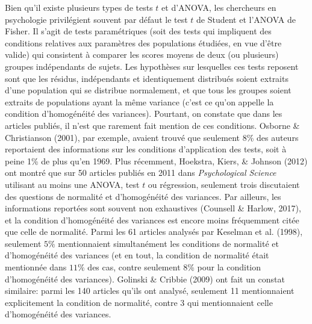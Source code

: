 \documentclass[
  12pt,
  french,
]{article}
\begin{document}
Bien qu'il existe plusieurs types de tests \(t\) et d'ANOVA, les
chercheurs en psychologie privilégient souvent par défaut le test \(t\)
de Student et l'ANOVA de
Fisher.
Il s'agit de tests paramétriques (soit des tests qui impliquent des
conditions relatives aux paramètres des populations étudiées, en vue
d'être valide) qui consistent à comparer les scores moyens de deux (ou
plusieurs) groupes indépendants de sujets. Les hypothèses sur lesquelles
ces tests reposent sont que les résidus, indépendants et identiquement
distribués soient extraits d'une population qui se distribue
normalement, et que tous les groupes soient extraits de populations
ayant la même variance (c'est ce qu'on appelle la condition
d'homogénéité des variances). Pourtant, on constate que dans les
articles publiés, il n'est que rarement fait mention de ces conditions.
Osborne \& Christianson (2001), par exemple, avaient trouvé que
seulement 8\% des auteurs reportaient des informations sur les
conditions d'application des tests, soit à peine 1\% de plus qu'en 1969.
Plus récemment, Hoekstra, Kiers, \& Johnson (2012) ont montré que sur 50
articles publiés en 2011 dans \emph{Psychological Science} utilisant au
moins une ANOVA, test \(t\) ou régression, seulement trois discutaient
des questions de normalité et d'homogénéité des variances. Par ailleurs,
les informations reportées sont souvent non exhaustives (Counsell \&
Harlow, 2017), et la condition d'homogénéité des variances est encore
moins fréquemment citée que celle de normalité. Parmi les 61 articles
analysés par Keselman et al. (1998), seulement \(5\%\) mentionnaient
simultanément les conditions de normalité et d'homogénéité des variances
(et en tout, la condition de normalité était mentionnée dans \(11\%\)
des cas, contre seulement 8\% pour la condition d'homogénéité des
variances). Golinski \& Cribbie (2009) ont fait un constat similaire:
parmi les 140 articles qu'ils ont analysé, seulement 11 mentionnaient
explicitement la condition de normalité, contre 3 qui mentionnaient
celle d'homogénéité des variances.
\end{document}
